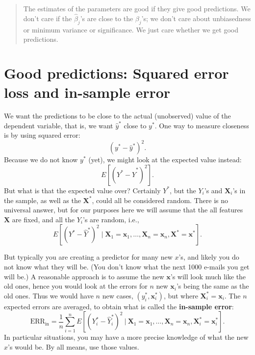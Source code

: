 \documentclass[
]{book}
\begin{document}
\begin{quote}
The estimates of the parameters are good if they give good predictions. We don't care if the \(\widehat\beta_j\)'s are
close to the \(\beta_j\)'s; we don't care about unbiasedness or minimum variance or significance. We just care whether
we get good predictions.
\end{quote}

\hypertarget{good-pred-section}{%
\section{Good predictions: Squared error loss and in-sample error}\label{good-pred-section}}

We want the predictions to be close to the actual (unobserved) value of the dependent variable, that is, we want \(\widehat{y}^{*}\) close to \(y^{*}\). One way to measure closeness is by using squared error:
\[
(y^{*}-\widehat{y}^{*})^2.
\]
Because we do not know \(y^{*}\) (yet), we might look at the expected value instead:
\[
E[(Y^{*}-\widehat{Y}^{*})^2].
\]
But what is that the expected value over? Certainly \(Y^{*}\), but the \(Y_i\)'s and \(\mathbf{X}_i\)'s in the sample, as well as the \(\mathbf{X}^{*}\), could all be considered random. There is no universal answer, but for our purposes here we will
assume that the all features \(\mathbf{X}\) are fixed, and all the \(Y_i\)'s are random, i.e.,
\begin{equation}
E[(Y^{*}-\widehat Y^{*})^2 \mid \mathbf{X}_1=\mathbf{x}_1,\ldots,\mathbf{X}_n=\mathbf{x}_n,\mathbf{X}^{*}=\mathbf{x}^{*}].
\label{eq:lm7}
\end{equation}

But typically you are creating a predictor for many new \(x\)'s, and likely you do not know what they will be. (You don't know what the next 1000 e-mails you get will be.) A reasonable approach is to assume the new \(\mathbf{x}\)'s will look much like the old ones, hence you would look at the errors for \(n\) new \(\mathbf{x}_i\)'s being the same as the old ones. Thus we would have \(n\) new cases, \((y_i^{*},\mathbf{x}_i^{*})\), but where \(\mathbf{X}_i^{*}=\mathbf{x}_i\). The \(n\) expected errors are averaged, to obtain what is called the \textbf{in-sample error}:
\begin{equation}
\text{ERR}_{\text{in}} = \frac{1}{n} \sum_{i=1}^n E[(Y_i^{*}-\widehat Y_i^{*})^2~|~\mathbf{X}_1=\mathbf{x}_1,\ldots,\mathbf{X}_n=\mathbf{x}_n,\mathbf{X}_i^{*}=\mathbf{x}_i^{*}].
\label{eq:lm8}
\end{equation}
In particular situations, you may have a more precise knowledge of what the new \(x\)'s would be. By all means, use those values.
\end{document}

